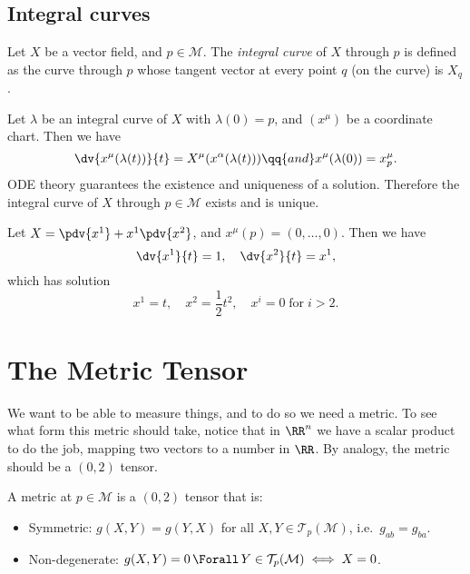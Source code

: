 \documentclass{jknotes}
\begin{document}
\subsection{Integral curves}
\begin{defn}
    Let \(X\) be a vector field, and \(p\in\mathcal{M}\). The \emph{integral curve} of \(X\) through \(p\) is defined as the curve through \(p\) whose tangent vector at every point \(q\) (on the curve) is \(X_q\).
\end{defn}

Let \(\lambda\) be an integral curve of \(X\) with \(\lambda(0) = p\), and \((x^\mu)\) be a coordinate chart. Then we have
\begin{equation}
    \dv{x^\mu(\lambda(t))}{t} = X^\mu(x^\alpha(\lambda(t))) \qq{and} x^\mu(\lambda(0)) = x^\mu_p.
\end{equation}
ODE theory guarantees the existence and uniqueness of a solution. Therefore the integral curve of \(X\) through \(p\in \mathcal{M}\) exists and is unique.
\begin{eg}
    Let \(X = \pdv{x^1} + x^1\pdv{x^2}\), and \(x^\mu(p) = (0,\dots,0)\). Then we have
    \begin{equation}
        \dv{x^1}{t} = 1,\quad \dv{x^2}{t} = x^1,
    \end{equation}
    which has solution
    \begin{equation}
        x^1=t,\quad x^2=\frac12 t^2,\quad x^i=0 \;\text{for}\; i > 2.
    \end{equation}
\end{eg}

\section{The Metric Tensor}
We want to be able to measure things, and to do so we need a metric. To see what form this metric should take, notice that in \(\RR^n\) we have a scalar product to do the job, mapping two vectors to a number in \(\RR\). By analogy, the metric should be a \((0,2)\) tensor.

\begin{defn}
    A metric at \(p\in \mathcal{M}\) is a \((0,2)\) tensor that is:
    \begin{itemize}
        \item Symmetric: \(g(X,Y) = g(Y,X)\) for all \(X,Y\in\mathcal{T}_p(\mathcal{M})\), i.e.\ \(g_{ab} = g_{ba}\).
        \item Non-degenerate: \(g(X,Y) = 0 \,\Forall\, Y\in\mathcal{T}_p(\mathcal{M}) \iff X=0\).
    \end{itemize}
\end{defn}
\end{document}
